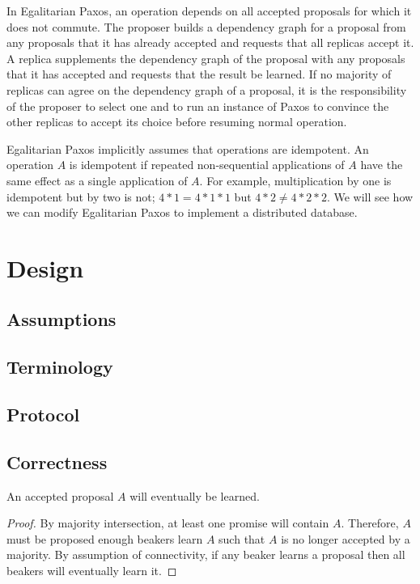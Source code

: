 \documentclass[../main.tex]{subfiles}
\begin{document}
  In Egalitarian Paxos, an operation depends on all accepted proposals for which it does not
  commute. The proposer builds a dependency graph for a proposal from any proposals that it has
  already accepted and requests that all replicas accept it. A replica supplements the dependency
  graph of the proposal with any proposals that it has accepted and requests that the result be
  learned. If no majority of replicas can agree on the dependency graph of a proposal, it is the
  responsibility of the proposer to select one and to run an instance of Paxos to convince the
  other replicas to accept its choice before resuming normal operation.

  Egalitarian Paxos implicitly assumes that operations are idempotent. An operation $A$ is
  idempotent if repeated non-sequential applications of $A$ have the same effect as a single
  application of $A$. For example, multiplication by one is idempotent but by two is not;
  $4 * 1 = 4 * 1 * 1$ but $4 * 2 \ne 4 * 2 * 2$. We will see how we can modify Egalitarian Paxos to
  implement a distributed database.

\section{Design}

  \subsection{Assumptions}

  \subsection{Terminology}

  \subsection{Protocol}

  \subsection{Correctness}

  \begin{theorem}[Liveness]
    An accepted proposal $A$ will eventually be learned.
  \end{theorem}
  \begin{proof}
    By majority intersection, at least one promise will contain $A$. Therefore, $A$ must be proposed
    enough beakers learn $A$ such that $A$ is no longer accepted by a majority. By assumption of
    connectivity, if any beaker learns a proposal then all beakers will eventually learn it.
  \end{proof}
\end{document}
